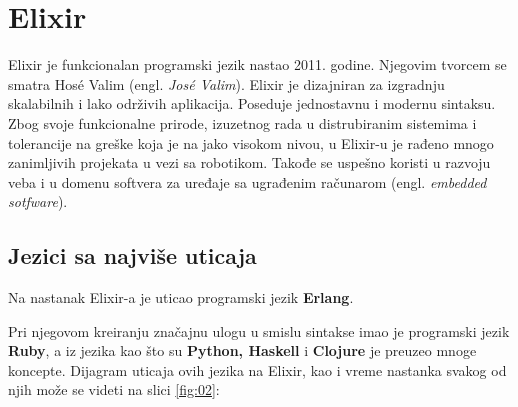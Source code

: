 \documentclass[12pt,oneside]{memoir}
\begin{document}
\frontmatter
\naslovna
\komisija
\apstrakt
\tableofcontents*

\mainmatter

\chapter{Elixir} %

Elixir je funkcionalan programski jezik nastao 2011. godine. Njegovim tvorcem se smatra Hosé Valim (engl. \textit{José Valim}). Elixir je dizajniran za izgradnju skalabilnih i lako održivih aplikacija. Poseduje jednostavnu i modernu sintaksu. Zbog svoje funkcionalne prirode, izuzetnog rada u distrubiranim sistemima i tolerancije na greške koja je na jako visokom nivou, u Elixir-u je rađeno mnogo zanimljivih projekata u vezi sa robotikom. Takođe se uspešno koristi u razvoju veba i u domenu softvera za uređaje sa ugrađenim računarom (engl. \textit{embedded sotfware}).

\newpage

\section{Jezici sa najviše uticaja}
Na nastanak Elixir-a je uticao programski jezik \textbf{Erlang}. 
\begin{comment}Elixir radi uz podršku virtualne mašine ovog jezika koja je karakteristična po minimalnom kašnjenju i zavidnoj toleranciji na greške. 
\end{comment}
Pri njegovom kreiranju značajnu ulogu u smislu sintakse imao je programski jezik \textbf{Ruby}, a iz jezika kao što su \textbf{Python, Haskell} i \textbf{Clojure} je preuzeo mnoge koncepte. Dijagram uticaja ovih jezika na Elixir, kao i vreme nastanka svakog od njih može se videti na slici \ref{fig:02}: 
\begin{comment}
U Elixir-u ne postoje objekti i klase, već se sve zasniva na funkcijama i rekurziji. (izmeni) 
\end{comment}
\end{document}
